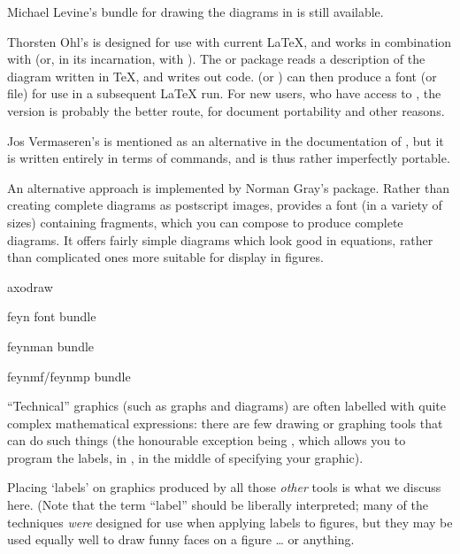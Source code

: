 
Michael Levine's  bundle for drawing the diagrams in
\LaTeXo{} is still available.

Thorsten Ohl's  is designed for use with current
\LaTeX{}, and works in
combination with \MF{} (or, in its  incarnation, with
\MP{}).  The  or
 package reads a description of the diagram written
in \TeX{}, and writes out code.  \MF{} (or \MP{}) can then produce a
font (or \PS{} file) for use in a subsequent \LaTeX{} run.  For
new users, who have access to \MP{}, the \PS{} version is
probably the better route, for document portability and other reasons.

Jos Vermaseren's  is mentioned as an alternative in
the documentation of , but it is written entirely in
terms of   commands, and is thus rather
imperfectly portable.

An alternative approach is implemented by Norman Gray's 
package.  Rather than creating complete diagrams as postscript images,
 provides a font (in a variety of sizes) containing
fragments, which you can compose to produce complete diagrams.  It
offers fairly simple diagrams which look good in equations, rather
than complicated ones more suitable for display in figures.
\begin{ctanrefs}
\item[axodraw]
\item[feyn \nothtml{\rmfamily}font bundle]
\item[feynman bundle]
\item[feynmf/feynmp bundle]
\end{ctanrefs}


``Technical'' graphics (such as graphs and diagrams) are often
labelled with quite complex mathematical expressions: there are few
drawing or graphing tools that can do such things (the honourable
exception being \MP{}, which allows you to program the labels, in
\AllTeX{}, in the middle of specifying your graphic).

Placing `labels' on graphics produced by all those \emph{other} tools is
what we discuss here.  (Note that the term ``label'' should be
liberally interpreted; many of the techniques \emph{were} designed for
use when applying labels to figures, but they may be used equally well
to draw funny faces on a figure \dots{} or anything.

